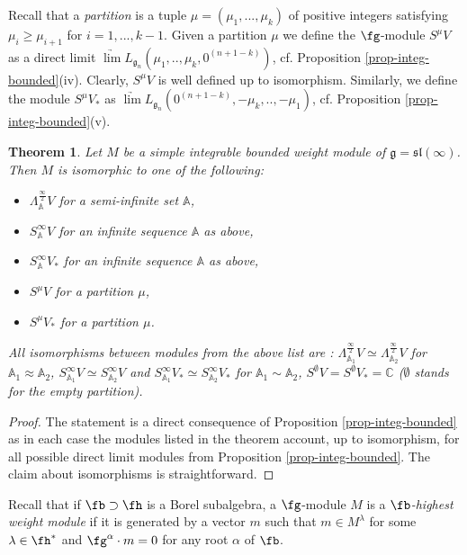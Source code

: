 \documentclass[12pt]{amsart}
\def\gg{\mathfrak{g}}
\def\gl{\mathfrak{l}}
\def\gs{\mathfrak{s}}
\newtheorem{thm}{Theorem}[section]
\begin{document}
 Recall that a \emph{partition} is a tuple $\mu=(\mu_1,...,\mu_k)$ of positive integers satisfying $\mu_i\geq\mu_{i+1}$ for $i=1,...,k-1$. Given a partition $\mu$ we define the $\fg$-module $S^\mu V$ as a direct limit  $\underrightarrow\lim L_{\gg_n} (\mu_1,..,\mu_k,0^{(n+1-k)})$, cf. Proposition \ref{prop-integ-bounded}(iv). Clearly, $S^\mu V$ is well defined up to isomorphism. Similarly, we define the module $S^{\mu} V_*$ as  $\underrightarrow\lim L_{\gg_n} (0^{(n+1-k)}, -\mu_k,..,-\mu_1)$,  cf. Proposition \ref{prop-integ-bounded}(v). 

 

\begin{thm} \label{thm-simple-integ-sl} Let $M$ be a simple integrable bounded weight module of $\gg = \gs \gl (\infty)$. Then $M$ is isomorphic to one of the following:
\begin{itemize}
\item[(i)] $\Lambda_{\mathbb A}^{\frac{\infty}{2}}V$ for a semi-infinite set ${\mathbb A}$,
\item[(ii)]  $S_{\mathbb A}^{\infty}V$ for an infinite sequence ${\mathbb A}$ as above,
\item[(iii)] $S_{\mathbb A}^{\infty}V_*$ for  an infinite sequence ${\mathbb A}$ as above,
\item[(iv)]  $S^{\mu} V$ for a partition $\mu$,
\item[(v)]  $S^{\mu} V_*$ for a partition $\mu$.
\end{itemize}
All isomorphisms between modules from the above list are : $\Lambda_{\mathbb A_1}^{\frac{\infty}{2}}V \simeq \Lambda_{\mathbb A_2}^{\frac{\infty}{2}}V$ for ${\mathbb A}_1\approx {\mathbb A}_2$,  $S_{\mathbb A_1}^{\infty}V \simeq S_{\mathbb A_2}^{\infty}V$ and $S_{\mathbb A_1}^{\infty}V_* \simeq S_{\mathbb A_2}^{\infty}V_*$ for ${\mathbb A}_1\sim {\mathbb A}_2$, $S^\emptyset V= S^\emptyset V_*=\mathbb{C}$ ($\emptyset$ stands for the empty partition).
\end{thm} 

\begin{proof}
The statement is a direct consequence of Proposition \ref{prop-integ-bounded} as in each case the modules listed in the theorem  account, up to isomorphism, for all possible direct limit modules from Proposition \ref{prop-integ-bounded}. The claim about isomorphisms is straightforward.
\end{proof}

Recall that if $\fb\supset \fh$ is a Borel subalgebra, a $\fg$-module $M$ is a $\fb$\emph{-highest weight module} if it is generated by a vector $m$ such that $m\in M^{\lambda}$ for some $\lambda \in \fh^*$ and $\fg^\alpha\cdot m=0$ for any root $\alpha$ of $\fb$. 
\end{document}
